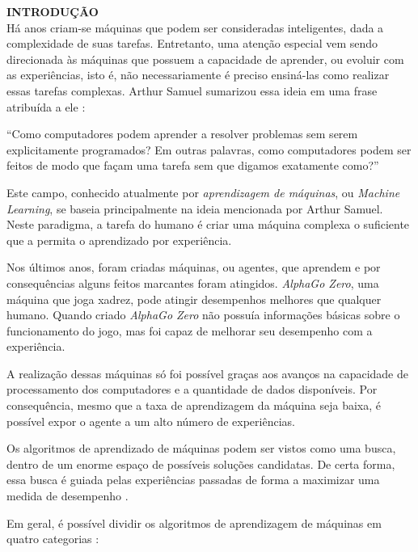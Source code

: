 \noindent\textbf{INTRODUÇÃO}
$\!$\\

Há anos criam-se máquinas que podem ser consideradas inteligentes, dada a complexidade de suas tarefas. Entretanto, uma atenção especial vem sendo direcionada às máquinas que possuem a capacidade de aprender, ou evoluir com as experiências, isto é, não necessariamente é preciso ensiná-las como realizar essas tarefas complexas. Arthur Samuel sumarizou essa ideia em uma frase atribuída a ele \cite{koza92bookGp}:

``Como computadores podem aprender a resolver problemas sem serem explicitamente programados? Em outras palavras, como computadores podem ser feitos de modo que façam uma tarefa sem que digamos exatamente como?''

Este campo, conhecido atualmente por \textit{aprendizagem de máquinas}, ou \textit{Machine Learning}, se baseia principalmente na ideia mencionada por Arthur Samuel. Neste paradigma, a tarefa do humano é criar uma máquina complexa o suficiente que a permita o aprendizado por experiência.

Nos últimos anos, foram criadas máquinas, ou agentes, que aprendem e por consequências alguns feitos marcantes foram atingidos. \textit{AlphaGo Zero}, uma máquina que joga xadrez, pode atingir desempenhos melhores que qualquer humano. Quando criado \textit{AlphaGo Zero} não possuía informações básicas sobre o funcionamento do jogo, mas foi capaz de melhorar seu desempenho com a experiência.

A realização dessas máquinas só foi possível graças aos avanços na capacidade de processamento dos computadores e a quantidade de dados disponíveis. Por consequência, mesmo que a taxa de aprendizagem da máquina seja baixa, é possível expor o agente a um alto número de experiências.

Os algoritmos de aprendizado de máquinas podem ser vistos como uma busca, dentro de um enorme espaço de possíveis soluções candidatas. De certa forma, essa busca é guiada pelas experiências passadas de forma a maximizar uma medida de desempenho \cite{jordan15Ml}.

Em geral, é possível dividir os algoritmos de aprendizagem de máquinas em quatro categorias \cite{marsland14Ml}:

